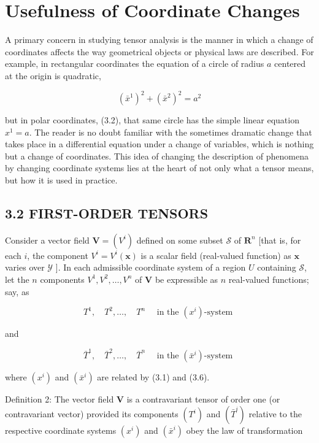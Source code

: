 \documentclass[10pt]{article}
\begin{document}
\section*{Usefulness of Coordinate Changes}
A primary concern in studying tensor analysis is the manner in which a change of coordinates affects the way geometrical objects or physical laws are described. For example, in rectangular coordinates the equation of a circle of radius $a$ centered at the origin is quadratic,

$$
\left(\bar{x}^{1}\right)^{2}+\left(\bar{x}^{2}\right)^{2}=a^{2}
$$

but in polar coordinates, (3.2), that same circle has the simple linear equation $x^{1}=a$. The reader is no doubt familiar with the sometimes dramatic change that takes place in a differential equation under a change of variables, which is nothing but a change of coordinates. This idea of changing the description of phenomena by changing coordinate systems lies at the heart of not only what a tensor means, but how it is used in practice.

\subsection*{3.2 FIRST-ORDER TENSORS}
Consider a vector field $\mathbf{V}=\left(V^{i}\right)$ defined on some subset $\mathscr{S}$ of $\mathbf{R}^{n}$ [that is, for each $i$, the component $V^{i}=V^{i}(\mathbf{x})$ is a scalar field (real-valued function) as $\mathbf{x}$ varies over $\mathscr{Y}$ ]. In each admissible coordinate system of a region $U$ containing $\mathscr{S}$, let the $n$ components $V^{1}, V^{2}, \ldots, V^{n}$ of $\mathbf{V}$ be expressible as $n$ real-valued functions; say, as

$$
T^{1}, \quad T^{2}, \ldots, \quad T^{n} \quad \text { in the }\left(x^{i}\right) \text {-system }
$$

and

$$
\bar{T}^{1}, \quad \bar{T}^{2}, \ldots, \quad \bar{T}^{n} \quad \text { in the }\left(\bar{x}^{i}\right) \text {-system }
$$

where $\left(x^{i}\right)$ and $\left(\bar{x}^{i}\right)$ are related by (3.1) and (3.6).

Definition 2: The vector field $\mathbf{V}$ is a contravariant tensor of order one (or contravariant vector) provided its components $\left(T^{i}\right)$ and $\left(\bar{T}^{i}\right)$ relative to the respective coordinate systems $\left(x^{i}\right)$ and $\left(\bar{x}^{i}\right)$ obey the law of transformation
\end{document}
